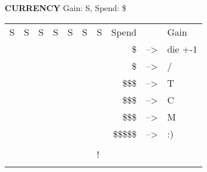 \begin{flushleft}
  \textbf{CURRENCY} \textcolor{supplemental}{Gain: S, Spend: \$}
\end{flushleft}
\label{currency}
\begin{tabular}{|
>{\columncolor{currency}}l |
>{\columncolor{currency}}l |
>{\columncolor{currency}}l |
>{\columncolor{currency}}l |
>{\columncolor{currency}}l |
>{\columncolor{currency}}l |
>{\columncolor{currency}}l |
r c l} \hhline{-------}
{\color[HTML]{000000} S} &
  {\color[HTML]{000000} S} &
  {\color[HTML]{000000} S} &
  {\color{currency} S} &
  {\color{currency} S} &
  {\color{currency} S} &
  {\color{currency} S} &
  Spend & & Gain \\ \hhline{-------}
{\color[HTML]{000000} } &
  {\color[HTML]{000000} } &
  {\color[HTML]{000000} } &
  {\color[HTML]{000000} } &
  {\color[HTML]{000000} } &
  {\color[HTML]{000000} } &
  {\color[HTML]{000000} } &
  \$ & --\textgreater{} & die +-1 \\ \hhline{-------}
{\color[HTML]{000000} } &
  {\color[HTML]{000000} } &
  {\color[HTML]{000000} } &
  {\color[HTML]{000000} } &
  {\color[HTML]{000000} } &
  {\color[HTML]{000000} } &
  {\color[HTML]{000000} } &
  \$ & --\textgreater{} & / \\ \hhline{-------}
{\color[HTML]{000000} } &
  {\color[HTML]{000000} } &
  {\color[HTML]{000000} } &
  {\color[HTML]{000000} } &
  {\color[HTML]{000000} } &
  {\color[HTML]{000000} } &
  {\color[HTML]{000000} } &
  \$\$\$ & --\textgreater{} & T \\ \hhline{-------}
{\color[HTML]{000000} } &
  {\color[HTML]{000000} } &
  {\color[HTML]{000000} } &
  {\color[HTML]{000000} } &
  {\color[HTML]{000000} } &
  {\color[HTML]{000000} } &
  {\color[HTML]{000000} } &
  \$\$\$ & --\textgreater{} & C \\ \hhline{-------}
{\color[HTML]{000000} } &
  {\color[HTML]{000000} } &
  {\color[HTML]{000000} } &
  {\color[HTML]{000000} } &
  {\color[HTML]{000000} } &
  {\color[HTML]{000000} } &
  {\color[HTML]{000000} } &
  \$\$\$ & --\textgreater{} & M \\ \hhline{-------}
{\color[HTML]{000000} } &
  {\color[HTML]{000000} } &
  {\color[HTML]{000000} } &
  {\color[HTML]{000000} } &
  {\color[HTML]{000000} } &
  {\color[HTML]{000000} } &
  {\color[HTML]{000000} } &
  \$\$\$\$\$ & --\textgreater{} & :) \\ \hhline{-------}
{\color[HTML]{000000} } &
  {\color[HTML]{000000} } &
  {\color[HTML]{000000} } &
  {\color[HTML]{000000} } &
  {\color[HTML]{000000} } &
  {\color[HTML]{000000} } &
  {\color[HTML]{000000} } & & & \\ \hhline{-------}
{\color[HTML]{000000} } &
  {\color[HTML]{000000} } &
  {\color[HTML]{000000} } &
  {\color[HTML]{000000} } &
  {\color[HTML]{000000} } &
  {\color[HTML]{000000} } &
  {\color[HTML]{000000} {!}} & & & \\ \hhline{-------}
\end{tabular}

